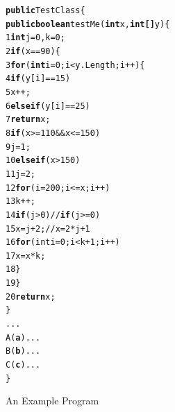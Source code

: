 {\begin{figure}[t]
\begin{CodeOut}
\begin{alltt}
  \textbf{public} TestClass\{
  \hspace{0.5cm}\textbf{public boolean} testMe(\textbf{int }x, \textbf{int[] } y)\{
1 \hspace{1.0cm} \textbf{int} j=0, k=0;
2 \hspace{1.0cm} \textbf{if}(x==90)\{
3 \hspace{1.5cm} \textbf{for}(\textbf{int} i=0; i< y.Length; i++)\{
4 \hspace{2.0cm} \textbf{if}(y[i] == 15)
5 \hspace{2.5cm} x++;
6 \hspace{2.0cm} \textbf{else if}(y[i] == 25)
7 \hspace{2.5cm} \textbf{return} x;
8 \hspace{2.0cm} \textbf{if}(x >= 110 && x<= 150)
9 \hspace{2.5cm} j =1;
10\hspace{2.0cm} \textbf{else if}(x>150)
11\hspace{2.5cm} j =2;
12\hspace{2.0cm} \textbf{for}(i=200; i<= x; i++)
13\hspace{2.5cm} k++;
14\hspace{2.0cm} \textbf{if}(j > 0) // \textbf{if}(j >= 0)
15\hspace{2.5cm} x = j+2; //x = 2*j+1
16\hspace{2.0cm} \textbf{for}(int i=0; i< k+1; i++) 
17\hspace{2.5cm} x = x*k;
18\hspace{1.5cm} \}
19\hspace{1.0cm} \}
20\hspace{1.0cm} \textbf{return} x;
  \hspace{0.5cm}\}
  \hspace{0.5cm}...
  \hspace{0.5cm}A (\textbf{a})...
  \hspace{0.5cm}B (\textbf{b})...
  \hspace{0.5cm}C (\textbf{c})...
  \}  
\end{alltt}
\end{CodeOut}
\vspace{-0.15 in}
\caption{An Example Program}
\label{fig:example}
\end{figure}


}

